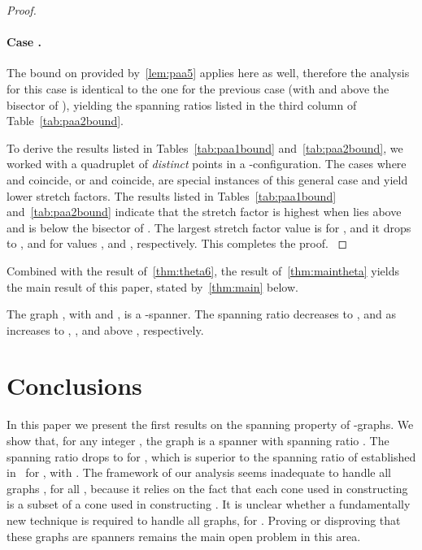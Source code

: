 \documentclass[runningheads,a4paper]{llncs}
\newcommand{\ABox}{
\raisebox{3pt}{\framebox[6pt]{\rule{6pt}{0pt}}}
}
\begin{document}
\begin{proof}
\paragraph{Case .} The bound on  provided by~\autoref{lem:paa5} applies here as well, therefore the analysis for this case is identical to the one for the previous case (with  and  above the bisector of ), yielding the spanning ratios listed in the third column of Table~\ref{tab:paa2bound}. 

To derive the results listed in Tables~\ref{tab:paa1bound} and~\ref{tab:paa2bound}, we worked with a quadruplet of \emph{distinct} points  in a  -configuration. The cases where  and  coincide, or  and  coincide, are special instances of this general case and yield lower stretch factors. 
The results listed in Tables~\ref{tab:paa1bound} and~\ref{tab:paa2bound} 
indicate that the stretch factor is highest when  lies above  and  is below the bisector of . The largest stretch factor value is  for , and it drops to ,  and  for  values 
,  and , respectively. This completes the proof.
{\hfill\ABox}\end{proof}
Combined with the result of~\autoref{thm:theta6}, the result of~\autoref{thm:maintheta} yields the main result of this paper, stated by~\autoref{thm:main} below. 

\begin{theorem} 
\label{thm:main}
The graph , with  and , is a -spanner. The spanning ratio decreases to ,  and  as  increases to , , and above , respectively.
\end{theorem}

\section{Conclusions}
In this paper we present the first results on the spanning property of -graphs. We show that, for any integer , the graph  is a spanner with spanning ratio . The spanning ratio drops to  for , which is superior to the spanning ratio of  established in~\cite{jDR12} for , with . The framework of our analysis seems inadequate to handle all graphs , for all , because it relies on the fact that each cone used in constructing  is a subset of a cone used in constructing . 
It is unclear whether a fundamentally new technique is  required to handle all  graphs, for . Proving or disproving that these graphs are spanners remains the main open problem in this area. 



\end{document}
